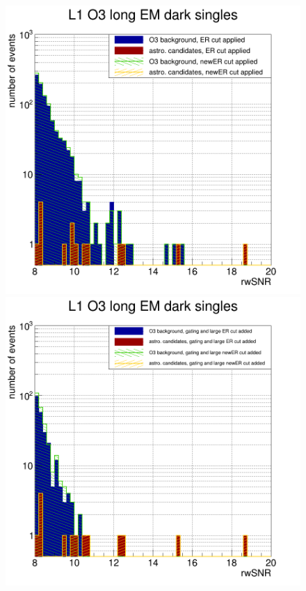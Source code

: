% 
\begin{figure}
  \centering
  \begin{minipage}{0.45\linewidth}
    \centering
    \includegraphics[width=\linewidth]{sectionSelection/plotsNewER/cL1dark_afterCutER_newER.png}
  \end{minipage}
  \hfill
  \begin{minipage}{0.45\linewidth}
    \centering
    \includegraphics[width=\linewidth]{sectionSelection/plotsNewER/cL1dark_afterCutMoreER_newER.png}
  \end{minipage}
  \hfill
  \label{fig:newER_emdarkLong}
\end{figure}
%

